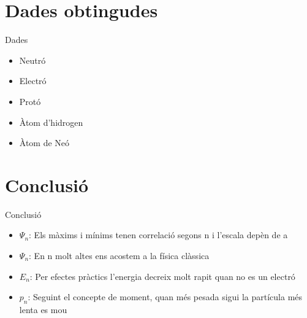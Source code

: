 \documentclass{beamer}
\begin{document}
\section{Dades obtingudes}
\begin{frame}{Dades}
    \begin{itemize}
        \item Neutró
        \item Electró
        \item Protó
        \item Àtom d'hidrogen
        \item Àtom de Neó
    \end{itemize}{}
\end{frame}{}

\section{Conclusió}
\begin{frame}{Conclusió}
    \begin{itemize}
        \item $\Psi_n$: Els màxims i mínims tenen correlació segons n i l'escala depèn de a
        \item $\Psi_n$: En n molt altes ens acostem a la física clàssica        
        \item $E_n$: Per efectes pràctics l'energia decreix molt rapit quan no es un electró
        \item $p_n$: Seguint el concepte de moment, quan més pesada sigui la partícula més lenta es mou
    \end{itemize}{}
\end{frame}{}
\end{document}
